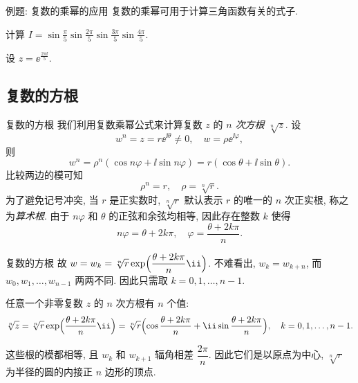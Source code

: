 \begin{frame}{例题: 复数的乘幂的应用\noexer}
	\onslide<+->
	复数的乘幂可用于计算三角函数有关的式子.
	\onslide<+->
	\begin{example}[nearnext]
		计算 $\displaystyle I =\sin\frac{\pi}5\sin\frac{2\pi}5\sin\frac{3\pi}5\sin\frac{4\pi}5$.
	\end{example}
	\onslide<+->
	\begin{solution}[nearprev]
		设 $z=\ee^{\frac{2\pi\ii}5}$.
		\bigdel
	\end{solution}
\end{frame}


\subsection{复数的方根}


\begin{frame}{复数的方根}
	\onslide<+->
	我们利用复数乘幂公式来计算复数 $z$ 的 \emph{$n$ 次方根 $\sqrt[n]z$}.
	\onslide<+->
	设
	\[
		w^n=z=r\ee^{\ii\theta}\neq0,\quad
		w=\rho \ee^{\ii\varphi},
	\]
	\onslide<+->
	则
	\[
		w^n=\rho^n(\cos{n\varphi}+\ii\sin{n\varphi})
		=r(\cos\theta+\ii\sin\theta).
	\]
	\onslide<+->
	比较两边的模可知
	\[
		\rho^n=r,\quad\rho=\sqrt[n]r.
	\]
	\onslide<+->
	为了避免记号冲突, 当 $r$ 是正实数时, $\sqrt[n]r$ 默认表示 $r$ 的唯一的 $n$ 次正实根, 称之为\emph{算术根}.
	\onslide<+->
	由于 $n\varphi$ 和 $\theta$ 的正弦和余弦均相等, 因此存在整数 $k$ 使得
	\[
		n\varphi=\theta+2k\pi,\quad
		\varphi=\frac{\theta+2k\pi}n.
	\]
\end{frame}


\begin{frame}{复数的方根}
	\onslide<+->
	故 $w=w_k=\sqrt[n]r\exp\Bigl(\dfrac{\theta+2k\pi}n\ii\Bigr)$.
	\onslide<+->
	不难看出, $w_k=w_{k+n}$, 而 $w_0,w_1,\dots,w_{n-1}$ 两两不同.
	\onslide<+->
	因此只需取 $k=0,1,\dots,n-1$.
	\onslide<+->
	\begin{theorem*}[][复数的方根]
		任意一个非零复数 $z$ 的 $n$ 次方根有 $n$ 个值:
		\[
			\sqrt[n]z=\sqrt[n]r\exp\Bigl(\dfrac{\theta+2k\pi}n\ii\Bigr)
			=\sqrt[n]r\Bigl(\cos\frac{\theta+2k\pi}n+\ii\sin\frac{\theta+2k\pi}n\Bigr),\quad k=0,1,\dots,n-1.
		\]
	\end{theorem*}
	\onslide<+->
	这些根的模都相等, 且 $w_k$ 和 $w_{k+1}$ 辐角相差 $\dfrac{2\pi}n$.
	\onslide<+->
	因此\alert{它们是以原点为中心, $\sqrt[n]r$ 为半径的圆的内接正 $n$ 边形的顶点}.
\end{frame}


